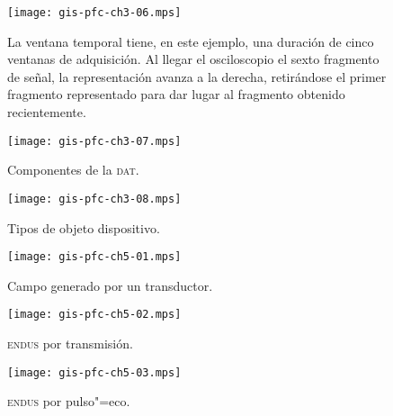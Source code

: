 \documentclass[a4paper,12pt]{article}
\begin{document}
\begin{figure}
	\begin{center}
		\texttt{[image: gis-pfc-ch3-06.mps]}
	\end{center}
	\caption[Modo de funcionamiento continuo]{La ventana temporal tiene, en este ejemplo, una duración de cinco ventanas de adquisición. Al llegar el osciloscopio el sexto fragmento de señal, la representación avanza a la derecha, retirándose el primer fragmento representado para dar lugar al fragmento obtenido recientemente.}
	\label{fig:digcontosccont}
\end{figure}

\clearpage

\begin{figure}
	\begin{center}
		\texttt{[image: gis-pfc-ch3-07.mps]}
	\end{center}
	\caption[Componentes de la \textsc{dat}]{Componentes de la \textsc{dat}.}
	\label{fig:dat}
\end{figure}

\begin{figure}
	\begin{center}
		\texttt{[image: gis-pfc-ch3-08.mps]}
	\end{center}
	\caption[Tipos de objeto dispositivo]{Tipos de objeto dispositivo.}
	\label{fig:devobject}
\end{figure}

\begin{figure}
	\begin{center}
		\texttt{[image: gis-pfc-ch5-01.mps]}
	\end{center}
	\caption[Campo generado por un transductor]{Campo generado por un transductor.}
	\label{fig:field}
\end{figure}

\begin{figure}
	\begin{center}
		\texttt{[image: gis-pfc-ch5-02.mps]}
	\end{center}
	\caption[\textsc{endus} por transmisión]{\textsc{endus} por transmisión.}
	\label{fig:transmission}
\end{figure}

\clearpage

\begin{figure}
	\begin{center}
		\texttt{[image: gis-pfc-ch5-03.mps]}
	\end{center}
	\caption[\textsc{endus} por pulso"=eco]{\textsc{endus} por pulso"=eco.}
	\label{fig:echo}
\end{figure}
\end{document}
